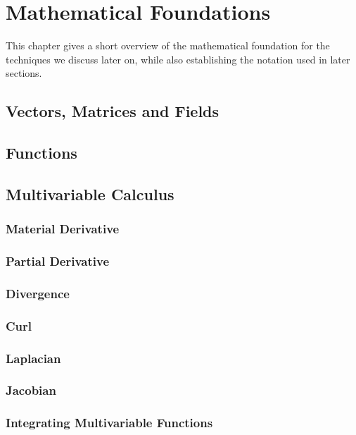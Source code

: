 \chapter{Mathematical Foundations}
\label{sec:mathematicalFoundations}
This chapter gives a short overview of the mathematical foundation for the
techniques we discuss later on, while also establishing the notation used in
later sections.

\section{Vectors, Matrices and Fields}


\section{Functions}

\section{Multivariable Calculus}

\subsection{Material Derivative}
\subsection{Partial Derivative}
\subsection{Divergence}
\subsection{Curl}
\subsection{Laplacian}
\subsection{Jacobian}
\subsection{Integrating Multivariable Functions}
